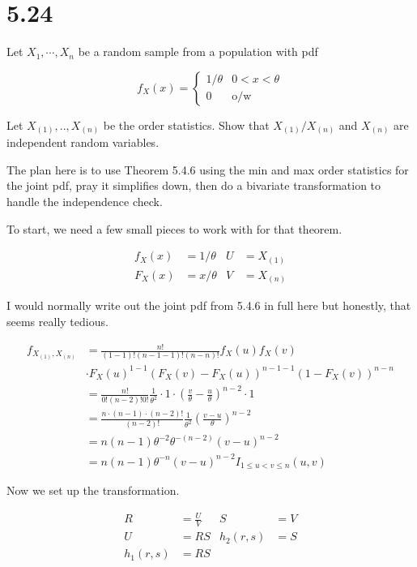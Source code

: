 \section{5.24}

Let $X_1,\cdots, X_n$ be a random sample from a population with pdf

\[
	f_X(x) =
	\begin{cases}
		1/\theta & 0<x<\theta \\
		0 & \text{o/w}
	\end{cases}
\]

Let $X_{(1)},..,X_{(n)}$ be the order statistics. Show that $X_{(1)}/X_{(n)}$ and $X_{(n)}$ are independent random variables.

The plan here is to use Theorem 5.4.6 using the min and max order statistics for the joint pdf, pray it simplifies down, then do a bivariate transformation to handle the independence check.

To start, we need a few small pieces to work with for that theorem.

\begin{align*}
	f_X(x) &= 1/\theta & U&=X_{(1)} \\
	F_X(x) &= x/\theta & V&=X_{(n)}
\end{align*}

I would normally write out the joint pdf from 5.4.6 in full here but honestly, that seems really tedious.

\begin{align*}
	f_{X_{(1)}, X_{(n)}} &= \frac{n!}{(1-1)!(n-1-1)!(n-n)!} f_X(u)f_X(v) \\
	&\cdot F_X(u)^{1-1}\left( F_X(v) - F_X(u) \right)^{n-1-1} (1-F_X(v))^{n-n} \\
	&= \frac{n!}{0!(n-2)!0!} \frac{1}{\theta^2} \cdot 1 \cdot \left( \frac{v}{\theta} - \frac{u}{\theta} \right)^{n-2} \cdot 1 \\
	&= \frac{n \cdot (n-1) \cdot (n-2)!}{(n-2)!} \frac{1}{\theta^2} \left( \frac{v-u}{\theta} \right)^{n-2} \\
	&= n(n-1)\theta^{-2}\theta^{-(n-2)}(v-u)^{n-2} \\
	&= n(n-1)\theta^{-n}(v-u)^{n-2}I_{1\leq u < v \leq n}(u,v)
\end{align*}

Now we set up the transformation. 

\vspace{-4mm}
\begin{align*}
	R &= \frac{U}{V} & S &= V \\
	U &= RS & h_2(r,s) &= S \\
	h_1(r,s) &= RS
\end{align*}


